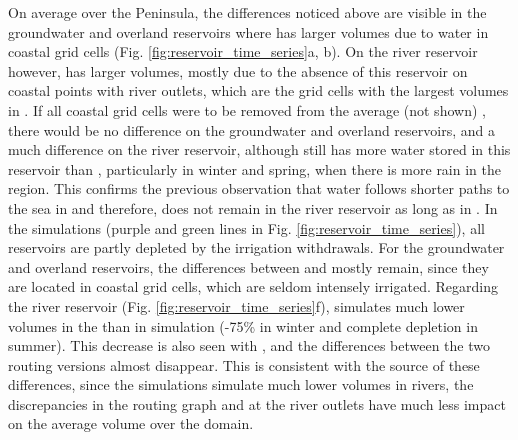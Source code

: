 On average over the Peninsula, the differences noticed above are visible in the groundwater and overland reservoirs where \native has larger volumes due to water in coastal grid cells (Fig. \ref{fig:reservoir_time_series}a, b). On the river reservoir however, \std has larger volumes, mostly due to the absence of this reservoir on coastal points with river outlets, which are the grid cells with the largest volumes in \std.
If all coastal grid cells were to be removed from the average (not shown)%
, there would be no difference on the groundwater and overland reservoirs, and a much difference on the river reservoir, although \std still has more water stored in this reservoir than \native, particularly in winter and spring, when there is more rain in the region. This confirms the previous observation that water follows shorter paths to the sea in \native and therefore, does not remain in the river reservoir as long as in \std.
In the \irr simulations (purple and green lines in Fig. \ref{fig:reservoir_time_series}), all reservoirs are partly depleted by the irrigation withdrawals. For the groundwater and overland reservoirs, the differences between \std and \native mostly remain, since they are located in coastal grid cells, which are seldom intensely irrigated.
Regarding the river reservoir (Fig. \ref{fig:reservoir_time_series}f), \std simulates much lower volumes in the \irr than in \noirr simulation (-75\% in winter and complete depletion in summer). This decrease is also seen with \native, and the differences between the two routing versions almost disappear. This is consistent with the source of these differences, since the \irr simulations simulate much lower volumes in rivers, the discrepancies in the routing graph and at the river outlets have much less impact on the average volume over the domain.

